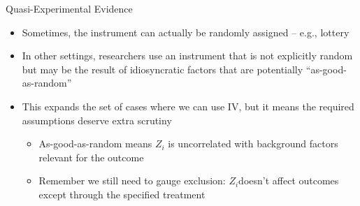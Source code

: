 \documentclass[11pt,notes=hide,aspectratio=169,mathserif]{beamer}
\begin{document}
\begin{frame}{Quasi-Experimental Evidence}
\begin{itemize}
  \item Sometimes, the instrument can actually be randomly assigned -- e.g., lottery
  \item In other settings, researchers use an instrument that is not explicitly
  random but may be the result of idiosyncratic factors that are
  potentially “as-good-as-random”
  \item This expands the set of cases where we can use IV, but it means the
  required assumptions deserve extra scrutiny
  \begin{itemize}
    \item As-good-as-random means $Z_i$
    is uncorrelated with background factors
    relevant for the outcome
    \item Remember we still need to gauge exclusion: $Z_i $doesn’t affect outcomes
    except through the specified treatment
  \end{itemize}
\end{itemize}
\end{frame}
\end{document}
